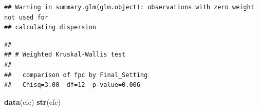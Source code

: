 \documentclass[
]{article}
\newenvironment{Shaded}{\begin{snugshade}}{\end{snugshade}}
\newcommand{\FunctionTok}[1]{\textcolor[rgb]{0.13,0.29,0.53}{\textbf{#1}}}
\newcommand{\NormalTok}[1]{#1}
\begin{document}
\begin{verbatim}
## Warning in summary.glm(glm.object): observations with zero weight not used for
## calculating dispersion
\end{verbatim}

\begin{verbatim}
## 
## # Weighted Kruskal-Wallis test
## 
##   comparison of fpc by Final_Setting
##   Chisq=3.00  df=12  p-value=0.006
\end{verbatim}

\begin{Shaded}
\begin{Highlighting}[]
\FunctionTok{data}\NormalTok{(efc)}
\FunctionTok{str}\NormalTok{(efc)}
\end{Highlighting}
\end{Shaded}
\end{document}
